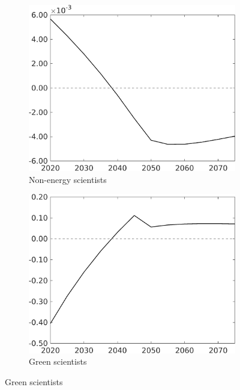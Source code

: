 \begin{figure}[h!!!]
	\begin{subfigure}{0.4\textwidth}
		\caption{Non-energy scientists}
		\includegraphics[width=1\textwidth]{../../codding_model/own_basedOnFried/optimalPol_010922_revision/figures/all_13Sept22_Tplus30/sn_OPT_COMPtaulPer_regime4_spillover0_knspil0_noskill0_sep0_xgrowth0_PV1_etaa0.79.png}
	\end{subfigure}
	\begin{subfigure}{0.4\textwidth}
	\caption{Green scientists}
	\includegraphics[width=1\textwidth]{../../codding_model/own_basedOnFried/optimalPol_010922_revision/figures/all_13Sept22_Tplus30/sg_OPT_COMPtaulPer_regime4_spillover0_knspil0_noskill0_sep0_xgrowth0_PV1_etaa0.79.png}

\end{subfigure}
\end{figure}
